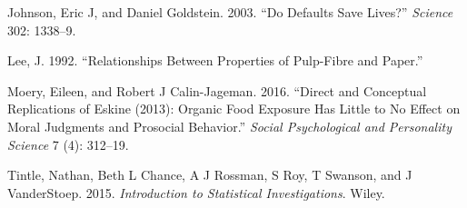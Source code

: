 \documentclass[]{book}
\theoremstyle{definition}
\theoremstyle{definition}
\theoremstyle{remark}
\begin{document}
\hypertarget{ref-Johnson2003}{}
Johnson, Eric J, and Daniel Goldstein. 2003. ``Do Defaults Save Lives?''
\emph{Science} 302: 1338--9.

\hypertarget{ref-Lee1992}{}
Lee, J. 1992. ``Relationships Between Properties of Pulp-Fibre and
Paper.''

\hypertarget{ref-Moery2016}{}
Moery, Eileen, and Robert J Calin-Jageman. 2016. ``Direct and Conceptual
Replications of Eskine (2013): Organic Food Exposure Has Little to No
Effect on Moral Judgments and Prosocial Behavior.'' \emph{Social
Psychological and Personality Science} 7 (4): 312--19.

\hypertarget{ref-Tintle2015}{}
Tintle, Nathan, Beth L Chance, A J Rossman, S Roy, T Swanson, and J
VanderStoep. 2015. \emph{Introduction to Statistical Investigations}.
Wiley.
\end{document}
